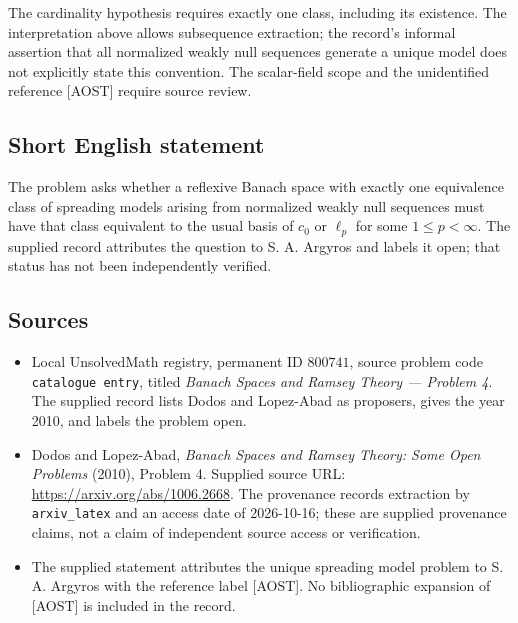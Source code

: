 \documentclass[11pt]{article}
\begin{document}
The cardinality hypothesis requires exactly one class, including its existence. The interpretation above allows subsequence extraction; the record's informal assertion that all normalized weakly null sequences generate a unique model does not explicitly state this convention. The scalar-field scope and the unidentified reference [AOST] require source review.
\subsection{Short English statement}
The problem asks whether a reflexive Banach space with exactly one equivalence class of spreading models arising from normalized weakly null sequences must have that class equivalent to the usual basis of \(c_0\) or \(\ell_p\) for some \(1\leq p<\infty\). The supplied record attributes the question to S. A. Argyros and labels it open; that status has not been independently verified.
\subsection{Sources}
\begin{itemize}
\item Local UnsolvedMath registry, permanent ID \(800741\), source problem code \texttt{catalogue entry}, titled \emph{Banach Spaces and Ramsey Theory --- Problem 4}. The supplied record lists Dodos and Lopez-Abad as proposers, gives the year 2010, and labels the problem open.
\item Dodos and Lopez-Abad, \emph{Banach Spaces and Ramsey Theory: Some Open Problems} (2010), Problem 4. Supplied source URL: \url{https://arxiv.org/abs/1006.2668}. The provenance records extraction by \texttt{arxiv\_latex} and an access date of 2026-10-16; these are supplied provenance claims, not a claim of independent source access or verification.
\item The supplied statement attributes the unique spreading model problem to S. A. Argyros with the reference label [AOST]. No bibliographic expansion of [AOST] is included in the record.
\end{itemize}
\end{document}
